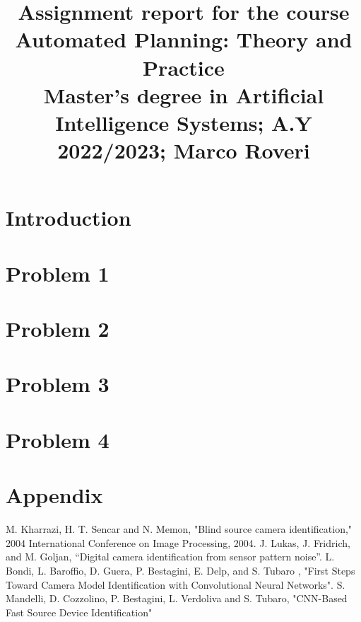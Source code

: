 \documentclass[conference]{IEEEtran}
\begin{document}
\title{Assignment report for the course\\ Automated Planning: Theory and Practice\\
{\footnotesize Master's degree in Artificial Intelligence Systems;
A.Y 2022/2023;
Marco Roveri}
}

\author{

\and
{}

}

\maketitle

\section{Introduction}

\section{Problem 1}

\section{Problem 2}

\section{Problem 3}

\section{Problem 4}



\section{Appendix}

\begin{thebibliography}{00}
 M. Kharrazi, H. T. Sencar and N. Memon, "Blind source camera identification," 2004 International Conference on Image Processing, 2004.
 J. Lukas, J. Fridrich, and M. Goljan, “Digital camera identification from sensor pattern noise”.
 L. Bondi, L. Baroffio, D. Guera, P. Bestagini, E. Delp, and S. Tubaro , "First Steps Toward Camera Model Identification with Convolutional Neural Networks".
 S. Mandelli, D. Cozzolino, P. Bestagini, L. Verdoliva and S. Tubaro, "CNN-Based Fast Source Device Identification"
\end{thebibliography}
\vspace{12pt}
\end{document}
